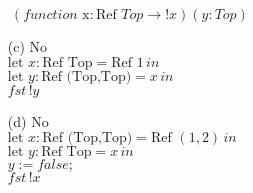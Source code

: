 \documentclass{article}
\newcommand{\step}[2]{{\tt #1} $\longrightarrow$ {\tt #2}}
\newcommand{\inferrule}[3]{\infrule[#1]{\mbox{#2}}{\mbox{#3}}}
\newcommand{\inferax}[2]{\infrule[#1]{\mbox{}}{\mbox{#2}}}
\begin{document}
\begin{description}
\begin{enumerate}
                $\ (function \text{ x}: \text{Ref }Top \rightarrow !x)(y:Top)$
                \item[(c)] {No}\\
                $\text{let } x: \text{Ref Top} = \text{Ref } 1 \, in $\\
                $\text{let } y: \text{Ref (Top,Top)} = x\, in$\\
                $fst\, !y$
                \item[(d)] {No}\\
                $\text{let } x: \text{Ref (Top,Top)} = \text{Ref } (1,2) \, in $\\
                $\text{let } y: \text{Ref Top} = x \,in$\\
                $y:=false;$\\
                $fst\, !x$
            \end{enumerate}
    \end{description}

%
%
%
%
%
%
%
%
%
%
%
%
%
%
%
%
%
%
%
\end{document}
